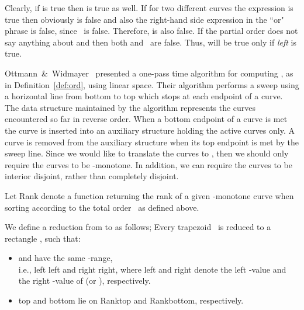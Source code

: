 Clearly, if  is true then  is true as well.
If for two different curves  the expression 
is true then obviously  is false
and also the right-hand side expression in the ``or" phrase is false, since~ is false. Therefore,  is also false.
If the partial order  does not say anything about  and 
then both  and~ are false.
Thus,  will be true only if  \emph{left}  is true.

Ottmann~\&~Widmayer~\cite{OW-TSLS-83} presented a one-pass
 time algorithm for computing
, as in Definition~\ref{def:ord}, using linear space.
Their algorithm performs a sweep using a horizontal line
from bottom to top which stops at each endpoint of a curve.
The data structure maintained by the algorithm represents
the curves encountered so far in reverse order.
When a bottom endpoint of a curve is met the curve is inserted into an auxiliary structure
holding the active curves only. A curve is removed from the auxiliary structure when its
top endpoint is met by the sweep line.
Since we would like to translate the curves to ,
then we should only require the curves to be -monotone.
In addition, we can require the curves to be interior disjoint,
rather than completely disjoint.



\begin{definition}
Let Rank denote a function
returning the rank of a given -monotone curve 
when sorting  according to the total order~ as defined above. \end{definition}

\begin{definition}
\label{def:reduction}
We define a reduction from \TcollReduc to
\RcollReduc as follows;
Every trapezoid~ is
reduced to a rectangle ,
such that:
\begin{itemize}
  \item \tred and \rred have the same -range,\\
  i.e., left left and
  right right,
  where left and right denote the left -value
  and the right -value of \tred (or \rred), respectively.
  \item top and bottom lie on Ranktop and
  Rankbottom, respectively.
\end{itemize}
\end{definition}

